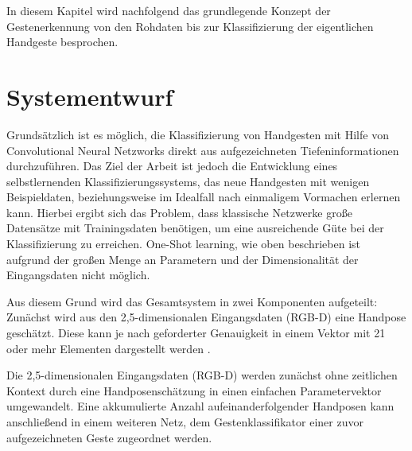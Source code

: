 In diesem Kapitel wird nachfolgend das grundlegende Konzept der Gestenerkennung von den Rohdaten bis zur Klassifizierung der eigentlichen Handgeste besprochen.

\section{Systementwurf}
Grundsätzlich ist es möglich, die Klassifizierung von Handgesten mit Hilfe von Convolutional Neural Netzworks direkt aus aufgezeichneten Tiefeninformationen durchzuführen. 
Das Ziel der Arbeit ist jedoch die Entwicklung eines selbstlernenden Klassifizierungssystems, das neue Handgesten mit wenigen Beispieldaten, beziehungsweise im Idealfall nach einmaligem Vormachen erlernen kann. Hierbei ergibt sich das Problem, dass klassische Netzwerke große Datensätze mit Trainingsdaten benötigen, um eine ausreichende Güte bei der Klassifizierung zu erreichen. One-Shot learning, wie oben beschrieben ist aufgrund der großen Menge an Parametern und der Dimensionalität der Eingangsdaten nicht möglich. 

Aus diesem Grund wird das Gesamtsystem in zwei Komponenten aufgeteilt: Zunächst wird aus den 2,5-dimensionalen Eingangsdaten (RGB-D) eine Handpose geschätzt. Diese kann je nach geforderter Genauigkeit in einem Vektor mit 21 oder mehr Elementen dargestellt werden .


Die 2,5-dimensionalen Eingangsdaten (RGB-D) werden zunächst ohne zeitlichen Kontext durch eine Handposenschätzung in einen einfachen Parametervektor umgewandelt. Eine akkumulierte Anzahl aufeinanderfolgender Handposen kann anschließend in einem weiteren Netz, dem Gestenklassifikator einer zuvor aufgezeichneten Geste zugeordnet werden.



